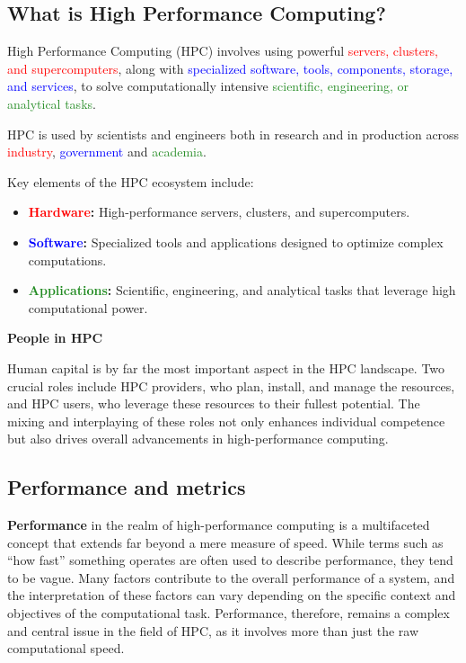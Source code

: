 \subsection{What is High Performance Computing?} \label{sec:what_is_hpc}

High Performance Computing (HPC) involves using powerful \textcolor{red}{servers, clusters, and supercomputers}, along with \textcolor{blue}{specialized software, tools, components, storage, and services}, to solve computationally intensive \textcolor{ForestGreen}{scientific, engineering, or analytical tasks}. 

HPC is used by scientists and engineers both in research and in production across \textcolor{red}{industry}, \textcolor{blue}{government} and \textcolor{ForestGreen}{academia}.

Key elements of the HPC ecosystem include:
\begin{itemize}
    \item \textbf{\textcolor{red}{Hardware}:} High-performance servers, clusters, and supercomputers.
    \item \textbf{\textcolor{blue}{Software}:} Specialized tools and applications designed to optimize complex computations.
    \item \textbf{\textcolor{ForestGreen}{Applications}:} Scientific, engineering, and analytical tasks that leverage high computational power.
\end{itemize}

\textbf{People in HPC}

Human capital is by far the most important aspect in the HPC landscape. Two crucial roles include HPC providers, who plan, install, and manage the resources, and HPC users, who leverage these resources to their fullest potential. The mixing and interplaying of these roles not only enhances individual competence but also drives overall advancements in high-performance computing.

\subsection{Performance and metrics} \label{sec:performance}

\textbf{Performance} in the realm of high-performance computing is a multifaceted concept that extends far beyond a mere measure of speed. While terms such as “how fast” something operates are often used to describe performance, they tend to be vague. Many factors contribute to the overall performance of a system, and the interpretation of these factors can vary depending on the specific context and objectives of the computational task. Performance, therefore, remains a complex and central issue in the field of HPC, as it involves more than just the raw computational speed.


